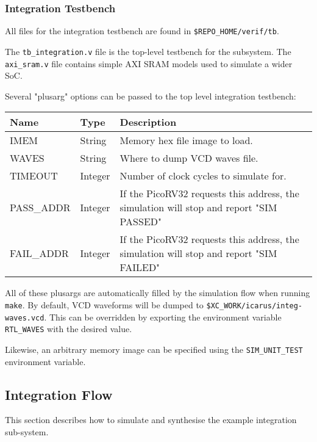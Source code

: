 \subsubsection{Integration Testbench}

All files for the integration testbench are found in 
{\tt \$REPO\_HOME/verif/tb}.

The {\tt tb\_integration.v} file is the top-level testbench for the 
subsystem.
The {\tt axi\_sram.v} file contains simple AXI SRAM models used to simulate
a wider SoC.

Several "plusarg" options can be passed to the top level integration
testbench:

\begin{table}[h]
\begin{tabularx}{\textwidth}{l l Y}
\toprule
\textbf{Name} & \textbf{Type} & \textbf{Description} \\ \midrule
  IMEM        & String        & Memory hex file image to load. \\
  WAVES       & String        & Where to dump VCD waves file.  \\
  TIMEOUT     & Integer       & Number of clock cycles to simulate for. \\
  PASS\_ADDR  & Integer       & If the PicoRV32 requests this address, the 
    simulation will stop and report "SIM PASSED"    \\
  FAIL\_ADDR  & Integer       & If the PicoRV32 requests this address, the
    simulation will stop and report "SIM FAILED" \\
\bottomrule
\end{tabularx}
\end{table}

All of these plusargs are automatically filled by the simulation flow
when running {\tt make}.
By default, VCD waveforms will be dumped to
{\tt \$XC\_WORK/icarus/integ-waves.vcd}.
This can be overridden by exporting the environment variable
{\tt RTL\_WAVES} with the desired value.

Likewise, an arbitrary memory image can be specified using the
{\tt SIM\_UNIT\_TEST} environment variable.


\subsection{Integration Flow}

This section describes how to simulate and synthesise the example
integration sub-system.

